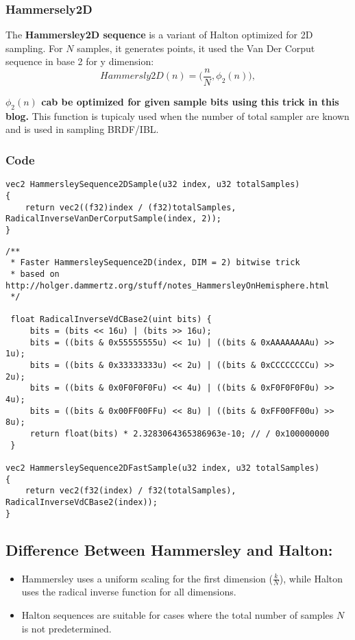 \documentclass{article}
\begin{document}
\subsubsection{Hammersely2D}
The \textbf{Hammersley2D sequence} is a variant of Halton optimized for 2D sampling. For $N$ samples, it generates points, it used the Van Der Corput sequence in base 2 for y dimension:
\[ 
	Hammersly2D(n) = \bigg(\frac{n}{N}, \phi_2(n)\bigg), 
\]

\textbf{$\phi_2(n)$ cab be optimized for given sample bits using this trick in this blog\cite{fasthammersely}.} This function is tupicaly used when the number of total sampler are known and is used in sampling BRDF/IBL.

\subsubsection{Code}
\begin{lstlisting}[caption={Hammersley sequence 2D}]
vec2 HammersleySequence2DSample(u32 index, u32 totalSamples)
{
    return vec2((f32)index / (f32)totalSamples, RadicalInverseVanDerCorputSample(index, 2));
}
\end{lstlisting}

\newpage

\begin{lstlisting}[caption={Fast Hammersley sequence 2D}]
/**
 * Faster HammersleySequence2D(index, DIM = 2) bitwise trick
 * based on http://holger.dammertz.org/stuff/notes_HammersleyOnHemisphere.html
 */
 
 float RadicalInverseVdCBase2(uint bits) {
     bits = (bits << 16u) | (bits >> 16u);
     bits = ((bits & 0x55555555u) << 1u) | ((bits & 0xAAAAAAAAu) >> 1u);
     bits = ((bits & 0x33333333u) << 2u) | ((bits & 0xCCCCCCCCu) >> 2u);
     bits = ((bits & 0x0F0F0F0Fu) << 4u) | ((bits & 0xF0F0F0F0u) >> 4u);
     bits = ((bits & 0x00FF00FFu) << 8u) | ((bits & 0xFF00FF00u) >> 8u);
     return float(bits) * 2.3283064365386963e-10; // / 0x100000000
 }

vec2 HammersleySequence2DFastSample(u32 index, u32 totalSamples)
{
    return vec2(f32(index) / f32(totalSamples), RadicalInverseVdCBase2(index));
}
\end{lstlisting}

\subsection{Difference Between Hammersley and Halton:}
\begin{itemize}
	\item Hammersley uses a uniform scaling for the first dimension ($\frac{k}{N}$), while Halton uses the radical inverse function for all dimensions.
	\item Halton sequences are suitable for cases where the total number of samples $N$ is not predetermined.
\end{itemize}
\end{document}

